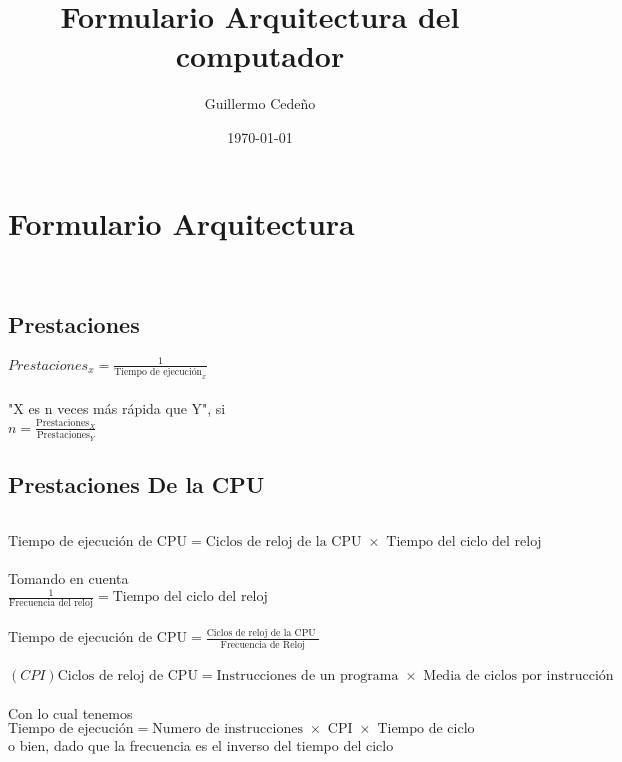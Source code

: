 \documentclass[11pt, letterpaper]{book}
\title{Formulario Arquitectura del computador}
\author{Guillermo Cedeño}
\date{\today}
\begin{document}
\section{Formulario Arquitectura}\\

\subsection{Prestaciones}

$\displaystyle Prestaciones_x = \frac{1}{\text{Tiempo de ejecución}_x}$\\\\

"X es n veces más rápida que Y", si\\


$\displaystyle n = \frac{\text{Prestaciones}_X}{\text{Prestaciones}_Y}$

\subsection{Prestaciones De la CPU}\\

$\displaystyle \text{Tiempo de ejecución de CPU} = \text{Ciclos de reloj de la CPU }\times{\text{ Tiempo del
ciclo del reloj}}$\\\\

Tomando en cuenta \\

$\displaystyle\frac{1}{\text{Frecuencia del reloj}} = \text{Tiempo del ciclo del reloj}$\\\\

$\displaystyle \text{Tiempo de ejecución de CPU} = \frac{\text{Ciclos de reloj de la CPU }}{\text{Frecuencia de Reloj}}$\\\\


$(CPI)\text{Ciclos de reloj de CPU} = \text{Instrucciones de un programa } \times {\text{ Media de ciclos por instrucción}}$\\\\
Con lo cual tenemos\\

$\text{Tiempo de ejecución} = \text{Numero de instrucciones } \times {\text{ CPI }}\times{\text{ Tiempo de ciclo}}$\\

o bien, dado que la frecuencia es el inverso del tiempo del ciclo\\
\end{document}
